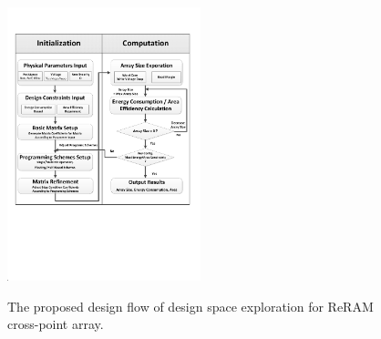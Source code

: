 \begin{figure}[!t]
\centering
  \includegraphics[width=0.5\textwidth]{./figures/FlowChart.pdf}\\
  \caption{The proposed design flow of design space exploration for ReRAM cross-point array.}\label{fig:FlowChart}
  \vspace{-5pt}
\end{figure}
